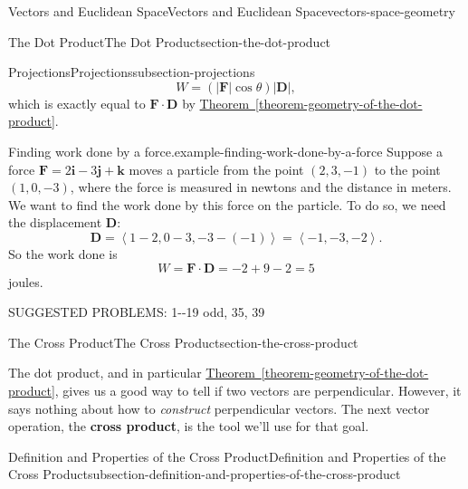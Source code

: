 \documentclass[oneside,10pt,]{book}
\newcommand{\terminology}[1]{\textbf{#1}}
\numberwithin{equation}{section}
\newcommand{\vv}[1]{\mathbf{#1}}
\newcommand{\dotprod}[1]{\left\langle #1 \right\rangle}
\begin{document}
\begin{chapterptx}{Vectors and Euclidean Space}{}{Vectors and Euclidean Space}{}{}{vectors-space-geometry}
\begin{sectionptx}{The Dot Product}{}{The Dot Product}{}{}{section-the-dot-product}
\begin{subsectionptx}{Projections}{}{Projections}{}{}{subsection-projections}
%
\begin{equation*}
W = (|\vv{F}|\cos\theta)|\vv{D}|,
\end{equation*}
\hypertarget{p-1160}{}%
which is exactly equal to \(\vv{F}\cdot\vv{D}\) by \hyperref[theorem-geometry-of-the-dot-product]{Theorem~\ref{theorem-geometry-of-the-dot-product}}.%
\begin{example}{Finding work done by a force.}{example-finding-work-done-by-a-force}%
\hypertarget{p-1161}{}%
Suppose a force \(\vv{F} = 2\vv{i}-3\vv{j}+\vv{k}\) moves a particle from the point \((2,3,-1)\) to the point \((1,0,-3)\), where the force is measured in newtons and the distance in meters. We want to find the work done by this force on the particle. To do so, we need the displacement \(\vv{D}\):%
%
\begin{equation*}
\vv{D} = \dotprod{1-2,0-3,-3-(-1)} = \dotprod{-1,-3,-2}.
\end{equation*}
\hypertarget{p-1162}{}%
So the work done is%
%
\begin{equation*}
W = \vv{F}\cdot\vv{D} = -2+9-2 = 5
\end{equation*}
\hypertarget{p-1163}{}%
joules.%
\end{example}
\hypertarget{p-1164}{}%
SUGGESTED PROBLEMS: 1-{}-{}19 odd, 35, 39%
\end{subsectionptx}
\end{sectionptx}
%
%
\typeout{************************************************}
\typeout{************************************************}
%
\begin{sectionptx}{The Cross Product}{}{The Cross Product}{}{}{section-the-cross-product}
\begin{introduction}{}%
\hypertarget{p-1165}{}%
The dot product, and in particular \hyperref[theorem-geometry-of-the-dot-product]{Theorem~\ref{theorem-geometry-of-the-dot-product}}, gives us a good way to tell if two vectors are perpendicular. However, it says nothing about how to \emph{construct} perpendicular vectors. The next vector operation, the \terminology{cross product}, is the tool we'll use for that goal.%
\end{introduction}%
%
%
\typeout{************************************************}
\typeout{************************************************}
%
\begin{subsectionptx}{Definition and Properties of the Cross Product}{}{Definition and Properties of the Cross Product}{}{}{subsection-definition-and-properties-of-the-cross-product}

\end{subsectionptx}
\end{sectionptx}
\end{chapterptx}
\end{document}
